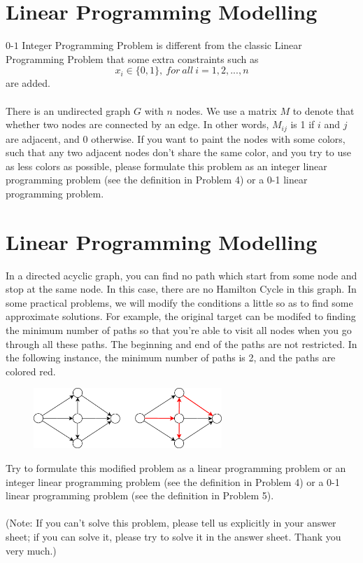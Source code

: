 \documentclass[a4paper,11pt]{article}
\begin{document}
\section{Linear Programming Modelling}
{\sc $0$-$1$ Integer Programming Problem} is different from the classic Linear Programming Problem that some extra constraints such as 
$$x_i\in\{0,1\},\ for\ all\ i=1,2,...,n$$
are added.\\\\
There is an undirected graph $G$ with $n$ nodes. We use a matrix $M$ to denote that whether two nodes are connected by an edge. In other words, $M_{ij}$ is 1 if $i$ and $j$ are adjacent, and 0 otherwise. If you want to paint the nodes with some colors, such that any two adjacent nodes don't share the same color, and you try to use as less colors as possible, please formulate this problem as an integer linear programming problem (see the definition in Problem 4) or a 0-1 linear programming problem.

\section{Linear Programming Modelling}
In a directed acyclic graph, you can find no path which start from some node and stop at the same node. In this case, there are no Hamilton Cycle in this graph. In some practical problems, we will modify the conditions a little so as to find some approximate solutions. For example, the original target can be modifed to finding the minimum number of paths so that you're able to visit all nodes when you go through all these paths. The beginning and end of the paths are not restricted. In the following instance, the minimum number of paths is 2, and the paths are colored red.
\begin{figure}[H]
   \centering
   \includegraphics[width=2.8in]{minimum_paths.eps}
  \label{minimum_paths}
\end{figure}
Try to formulate this modified problem as a linear programming problem or an integer linear programming problem (see the definition in Problem 4) or a 0-1 linear programming problem (see the definition in Problem 5).\\\\
(Note: If you can't solve this problem, please tell us explicitly in your answer sheet; if you can solve it, please try to solve it in the answer sheet. Thank you very much.)
\end{document}
